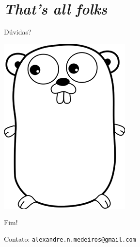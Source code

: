 \documentclass{beamer}
\begin{document}
\section{\em That's all folks}
\begin{frame}
    \centering
    \Large
    Dúvidas?

    \vspace{25pt}
    \includegraphics[width=.2\textwidth]{frontpage.png}
\end{frame}

\begin{frame}
    \centering
    \Large
    Fim!

    \vspace{20pt}
    \normalsize
    Contato: {\tt alexandre.n.medeiros@gmail.com}
\end{frame}
\end{document}
